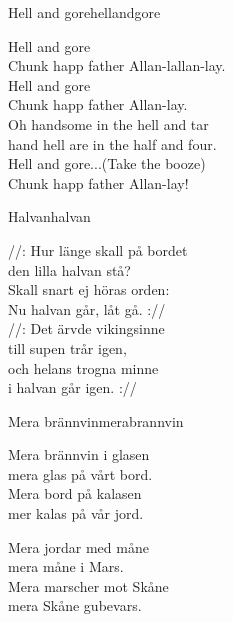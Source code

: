 \begin{song}{Hell and gore}{hellandgore}
\begin{vers}
Hell and gore\\
Chunk happ father Allan-lallan-lay.\\
Hell and gore\\
Chunk happ father Allan-lay.\\
Oh handsome in the hell and tar\\
hand hell are in the half and four.\\
Hell and gore...(Take the booze)\\
Chunk happ father Allan-lay!\\
\end{vers}
\end{song}

\newpage

\begin{song}{Halvan}{halvan}
\begin{vers}
//: Hur länge skall på bordet\\
den lilla halvan stå?\\
Skall snart ej höras orden:\\
Nu halvan går, låt gå. ://\\
//: Det ärvde vikingsinne\\
till supen trår igen,\\
och helans trogna minne\\
i halvan går igen. ://\\
\end{vers}
\end{song}

\begin{song}{Mera brännvin}{merabrannvin}
\begin{vers}
Mera brännvin i glasen\\
mera glas på vårt bord.\\
Mera bord på kalasen\\
mer kalas på vår jord.\\
\end{vers}
\begin{vers}
Mera jordar med måne\\
mera måne i Mars.\\
Mera marscher mot Skåne\\
mera Skåne gubevars.\\
\end{vers}
\end{song}

